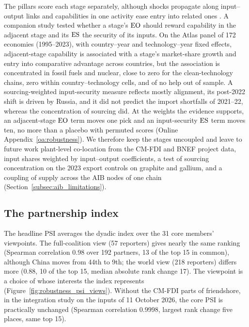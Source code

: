 The pillars score each stage separately, although shocks propagate along input--output links
\citep{acemoglu2012network,carvalho2021supply} and capabilities in one activity ease entry into
related ones \citep{hidalgo2007product}. A companion study tested whether a stage's $\mathrm{EO}$ should
reward capability in the adjacent stage and its $\mathrm{ES}$ the security of its inputs. On the Atlas panel
of 172 economies (1995--2023), with country--year and technology--year fixed effects, adjacent-stage
capability is associated with a stage's market-share growth and entry into comparative advantage
\citep{balassa1965trade} across countries, but the association is concentrated in fossil fuels and
nuclear, close to zero for the clean-technology chains, zero within country--technology cells, and
of no help out of sample. A sourcing-weighted input-security measure reflects mostly alignment, its
post-2022 shift is driven by Russia, and it did not predict the import shortfalls of 2021--22, whereas
the concentration of sourcing did. At the weights the evidence supports, an adjacent-stage $\mathrm{EO}$
term moves one pick and an input-security $\mathrm{ES}$ term moves ten, no more than a placebo with permuted
scores (Online Appendix~\ref{oa:robustness}). We therefore keep the stages uncoupled and leave to
future work plant-level co-location from the CM-FDI and BNEF project data, input shares weighted by
input--output coefficients, a test of sourcing concentration on the 2023 export controls on graphite
and gallium, and a coupling of supply across the AIB nodes of one chain
(Section~\ref{subsec:aib_limitations}).

\subsection{The partnership index}
\label{subsec:robust_psi}

The headline PSI averages the dyadic index over the 31 core members' viewpoints. The full-coalition
view (57 reporters) gives nearly the same ranking (Spearman correlation 0.98 over 192 partners, 13 of
the top 15 in common), although China moves from 44th to 9th; the world view (218 reporters) differs
more (0.88, 10 of the top 15, median absolute rank change 17). The viewpoint is a choice of whose
interests the index represents (Figure~\ref{fig:robustness_psi_views}). Without the CM-FDI parts of
friendshore, in the integration study on the inputs of 11 October 2026, the core PSI is practically
unchanged (Spearman correlation 0.9998, largest rank change five places, same top 15).

